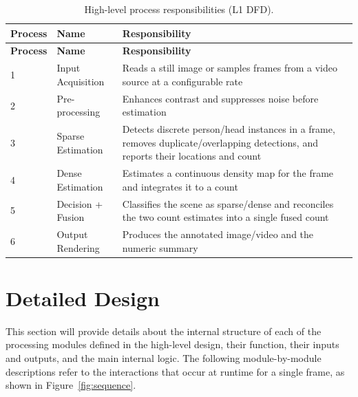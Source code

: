 \begin{longtable}{|
		>{\raggedright\arraybackslash}p{1.6cm}|
		>{\raggedright\arraybackslash}p{3.2cm}|
		>{\raggedright\arraybackslash}p{9.7cm}|
	}
    \caption{High-level process responsibilities (L1 DFD).}
    \label{tab:hld-processes} \\
    \hline
    \textbf{Process} & \textbf{Name} & \textbf{Responsibility} \\
    \hline
    \endfirsthead

    \hline
    \textbf{Process} & \textbf{Name} & \textbf{Responsibility} \\
    \hline
    \endhead

    1 & Input Acquisition &
    Reads a still image or samples frames from a video source at a configurable rate \\
    \hline
    
    2 & Pre-processing &
    Enhances contrast and suppresses noise before estimation \\
    \hline
    
    3 & Sparse Estimation &
    Detects discrete person/head instances in a frame, removes duplicate/overlapping detections, and reports their locations and count \\
    \hline
    
    4 & Dense Estimation &
    Estimates a continuous density map for the frame and integrates it to a count \\
    \hline
    
    5 & Decision + Fusion &
    Classifies the scene as sparse/dense and reconciles the two count estimates into a single fused count \\
    \hline
    
    6 & Output Rendering &
    Produces the annotated image/video and the numeric summary \\
    \hline

\end{longtable}

\section{Detailed Design}
\label{sec:detailed-design}

This section will provide details about the internal structure of each of the processing modules defined in the high-level design, their function, their inputs and outputs, and the main internal logic. The following module-by-module descriptions refer to the interactions that occur at runtime for a single frame, as shown in Figure~\ref{fig:sequence}.

